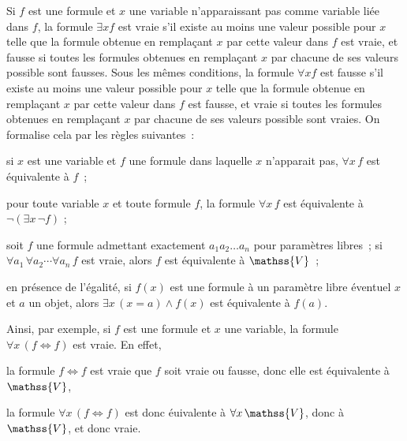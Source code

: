 Si $f$ est une formule et $x$ une variable n'apparaissant pas comme variable liée dans $f$, la formule $\exists x f$ est vraie s'il existe au moins une valeur possible pour $x$ telle que la formule obtenue en remplaçant $x$ par cette valeur dans $f$ est vraie, et fausse si toutes les formules obtenues en remplaçant $x$ par chacune de ses valeurs possible sont fausses. 
Sous les mêmes conditions, la formule $\forall x f$ est fausse s'il existe au moins une valeur possible pour $x$ telle que la formule obtenue en remplaçant $x$ par cette valeur dans $f$ est fausse, et vraie si toutes les formules obtenues en remplaçant $x$ par chacune de ses valeurs possible sont vraies. 
On formalise cela par les règles suivantes : 
\startitemize
  \item si $x$ est une variable et $f$ une formule dans laquelle $x$ n'apparait pas, $\forall x \, f$ est équivalente à $f$ ; 
  \item pour toute variable $x$ et toute formule $f$, la formule $\forall x \, f$ est équivalente à $\lnot (\exists x \, \lnot f)$ ;
  \item soit $f$ une formule admettant exactement $a_1 a_2 \dots a_n$ pour paramètres libres ; si $\forall a_1 \, \forall a_2 \cdots \forall a_n \, f$ est vraie, alors $f$ est équivalente à $\mathss{V}$ ; 
  \item en présence de l'égalité, si $f(x)$ est une formule à un paramètre libre éventuel $x$ et $a$ un objet, alors $\exists x \, (x = a) \wedge f(x)$ est équivalente à $f(a)$.
\stopitemize

Ainsi, par exemple, si $f$ est une formule et $x$ une variable, la formule $\forall x \, (f \Leftrightarrow f)$ est vraie. 
En effet, 
\startitemize[nowhite]
  \item la formule $f \Leftrightarrow f$ est vraie que $f$ soit vraie ou fausse, donc elle est équivalente à $\mathss{V}$,
  \item la formule $\forall x \, (f \Leftrightarrow f)$ est donc éuivalente à $\forall x \, \mathss{V}$, donc à $\mathss{V}$, et donc vraie.
\stopitemize


